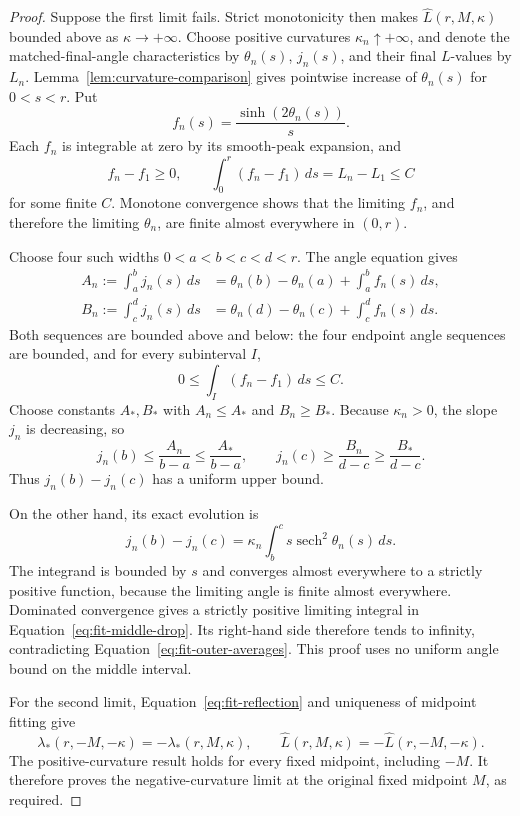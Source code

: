 \begin{proof}
Suppose the first limit fails.  Strict monotonicity then makes
\(\widehat L(r,M,\kappa)\) bounded above as \(\kappa\to+\infty\).
Choose positive curvatures \(\kappa_n\uparrow+\infty\), and denote
the matched-final-angle characteristics by \(\theta_n(s)\),
\(j_n(s)\), and their final \(L\)-values by \(L_n\).
Lemma~\ref{lem:curvature-comparison} gives pointwise increase of
\(\theta_n(s)\) for \(0<s<r\).  Put
\[
 f_n(s)=\frac{\sinh(2\theta_n(s))}{s}.
\]
Each \(f_n\) is integrable at zero by its smooth-peak expansion,
and
\[
 f_n-f_1\ge0,\qquad
 \int_0^r(f_n-f_1)\,ds=L_n-L_1\le C
\]
for some finite \(C\).  Monotone convergence shows that the limiting
\(f_n\), and therefore the limiting \(\theta_n\), are finite almost
everywhere in \((0,r)\).

Choose four such widths \(0<a<b<c<d<r\).  The angle equation gives
\begin{align*}
 A_n:=\int_a^b j_n(s)\,ds
    &=\theta_n(b)-\theta_n(a)+\int_a^b f_n(s)\,ds,\\
 B_n:=\int_c^d j_n(s)\,ds
    &=\theta_n(d)-\theta_n(c)+\int_c^d f_n(s)\,ds.
\end{align*}
Both sequences are bounded above and below: the four endpoint
angle sequences are bounded, and for every subinterval \(I\),
\[
 0\le\int_I(f_n-f_1)\,ds\le C.
\]
Choose constants \(A_*,B_*\) with \(A_n\le A_*\) and
\(B_n\ge B_*\).  Because \(\kappa_n>0\), the slope \(j_n\) is
decreasing, so
\begin{equation}\label{eq:fit-outer-averages}
 j_n(b)\le\frac{A_n}{b-a}\le\frac{A_*}{b-a},\qquad
 j_n(c)\ge\frac{B_n}{d-c}\ge\frac{B_*}{d-c}.
\end{equation}
Thus \(j_n(b)-j_n(c)\) has a uniform upper bound.

On the other hand, its exact evolution is
\begin{equation}\label{eq:fit-middle-drop}
 j_n(b)-j_n(c)
    =\kappa_n\int_b^c s\operatorname{sech}^2\theta_n(s)\,ds.
\end{equation}
The integrand is bounded by \(s\) and converges almost everywhere
to a strictly positive function, because the limiting angle is
finite almost everywhere.  Dominated convergence gives a strictly
positive limiting integral in Equation~\eqref{eq:fit-middle-drop}.
Its right-hand side therefore tends to infinity, contradicting
Equation~\eqref{eq:fit-outer-averages}.  This proof uses no uniform
angle bound on the middle interval.

For the second limit, Equation~\eqref{eq:fit-reflection} and uniqueness
of midpoint fitting give
\[
 \lambda_*(r,-M,-\kappa)=-\lambda_*(r,M,\kappa),\qquad
 \widehat L(r,M,\kappa)=-\widehat L(r,-M,-\kappa).
\]
The positive-curvature result holds for every fixed midpoint,
including \(-M\).  It therefore proves the negative-curvature limit
at the original fixed midpoint \(M\), as required.
\end{proof}

